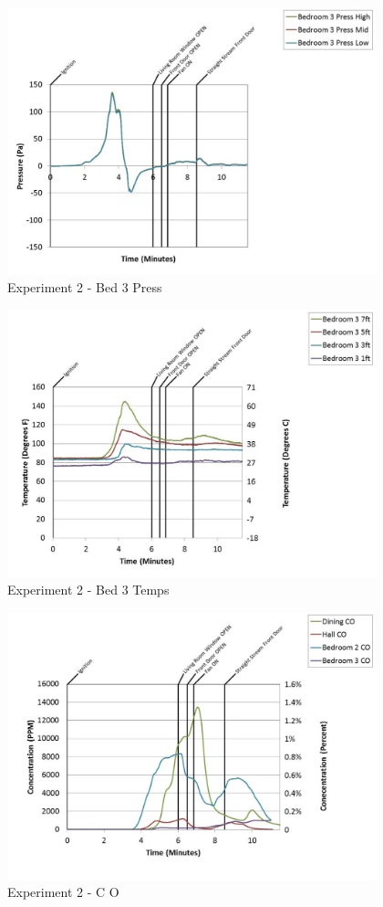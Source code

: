 \documentclass{article}
\begin{document}
\begin{appendices}
	\clearpage

	\begin{figure}[h!]
		\centering
		\includegraphics[height=3.05in]{0_Images/Results_Charts/Exp_2_Charts/Bed3Press.pdf}
		\caption{Experiment 2 - Bed 3 Press}
	\end{figure}
 

	\begin{figure}[h!]
		\centering
		\includegraphics[height=3.05in]{0_Images/Results_Charts/Exp_2_Charts/Bed3Temps.pdf}
		\caption{Experiment 2 - Bed 3 Temps}
	\end{figure}
 
	\clearpage

	\begin{figure}[h!]
		\centering
		\includegraphics[height=3.05in]{0_Images/Results_Charts/Exp_2_Charts/CO.pdf}
		\caption{Experiment 2 - C O}
	\end{figure}
 


\end{appendices}
\end{document}
